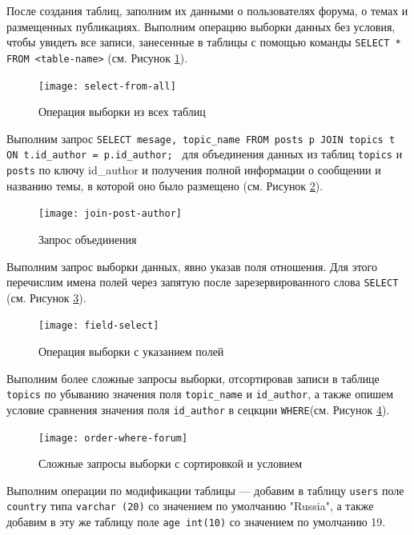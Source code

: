 После создания таблиц, заполним их данными о пользователях форума, о темах и размещенных публикациях. Выполним операцию выборки данных без условия, чтобы увидеть все записи, занесенные в таблицы с помощью команды \texttt{SELECT * FROM <table-name>} (см. Рисунок \ref{fig:select-from-all}). 

\begin{figure}[h!]
	\centering
	\texttt{[image: select-from-all]}
	\caption{Операция выборки из всех таблиц }
	\label{fig:select-from-all}
\end{figure}

Выполним запрос \texttt{SELECT mesage, topic\_name FROM posts p JOIN topics t ON t.id\_author = p.id\_author; } для объединения данных из таблиц \texttt{topics} и \texttt{posts} по ключу id\_author и получения полной информации о сообщении и названию темы, в которой оно было размещено (см. Рисунок \ref{fig:join-post-author}).

\begin{figure}[ht]
	\centering
	\texttt{[image: join-post-author]}
	\caption{Запрос объединения}
	\label{fig:join-post-author}
\end{figure}

Выполним запрос выборки данных, явно указав поля отношения. Для этого перечислим имена полей через запятую после зарезервированного слова \texttt{SELECT} (см. Рисунок \ref{fig:field-select}).

\begin{figure}[h!]
	\centering
	\texttt{[image: field-select]}
	\caption{Операция выборки с указанием полей}
	\label{fig:field-select}
\end{figure}


Выполним более сложные запросы выборки, отсортировав записи в таблице \texttt{topics} по убыванию значения поля \texttt{topic\_name} и \texttt{id\_author}, а также опишем условие сравнения значения поля \texttt{id\_author} в сецкции \texttt{WHERE}(см. Рисунок \ref{fig:order-where-forum}). 

\begin{figure}[h!]
	\centering
	\texttt{[image: order-where-forum]}
	\caption{Сложные запросы выборки с сортировкой и условием}
	\label{fig:order-where-forum}
\end{figure}

Выполним операции по модификации таблицы --- добавим в таблицу \texttt{users} поле \texttt{country} типа \texttt{varchar (20)} со значением по умолчанию "Russia", а также добавим в эту же таблицу поле \texttt{age int(10)} со значением по умолчанию 19. 

